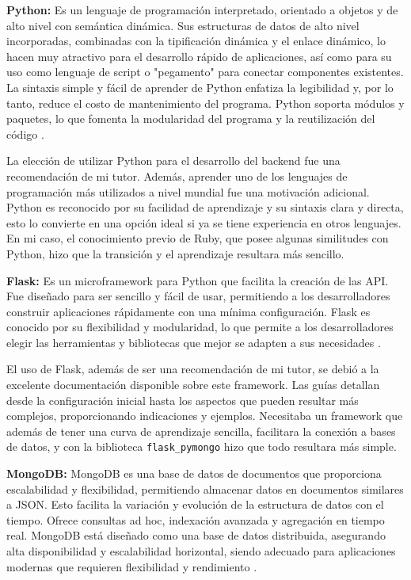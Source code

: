 \textbf{Python:} Es un lenguaje de programación interpretado, orientado a objetos y de alto nivel con semántica dinámica. Sus estructuras de datos de alto nivel incorporadas, combinadas con la tipificación dinámica y el enlace dinámico, lo hacen muy atractivo para el desarrollo rápido de aplicaciones, así como para su uso como lenguaje de script o "pegamento" para conectar componentes existentes. La sintaxis simple y fácil de aprender de Python enfatiza la legibilidad y, por lo tanto, reduce el costo de mantenimiento del programa. Python soporta módulos y paquetes, lo que fomenta la modularidad del programa y la reutilización del código \cite{python_faq}.

La elección de utilizar Python para el desarrollo del backend fue una recomendación de mi tutor. Además, aprender uno de los lenguajes de programación más utilizados a nivel mundial fue una motivación adicional. Python es reconocido por su facilidad de aprendizaje y su sintaxis clara y directa, esto lo convierte en una opción ideal si ya se tiene experiencia en otros lenguajes. En mi caso, el conocimiento previo de Ruby, que posee algunas similitudes con Python, hizo que la transición  y el aprendizaje resultara más sencillo.

\textbf{Flask:} Es un microframework para Python que facilita la creación de las API. Fue diseñado para ser sencillo y fácil de usar, permitiendo a los desarrolladores construir aplicaciones rápidamente con una mínima configuración. Flask es conocido por su flexibilidad y modularidad, lo que permite a los desarrolladores elegir las herramientas y bibliotecas que mejor se adapten a sus necesidades \cite{python_basics}.

El uso de Flask, además de ser una recomendación de mi tutor, se debió a la excelente documentación disponible sobre este framework. Las guías detallan desde la configuración inicial hasta los aspectos que pueden resultar más complejos, proporcionando indicaciones y ejemplos. Necesitaba un framework que además de tener una curva de aprendizaje sencilla, facilitara la conexión a bases de datos, y con la biblioteca \texttt{flask\_pymongo} hizo que todo resultara más simple.


\textbf{MongoDB:} MongoDB es una base de datos de documentos que proporciona escalabilidad y flexibilidad, permitiendo almacenar datos en documentos similares a JSON. Esto facilita la variación y evolución de la estructura de datos con el tiempo. Ofrece consultas ad hoc, indexación avanzada y agregación en tiempo real. MongoDB está diseñado como una base de datos distribuida, asegurando alta disponibilidad y escalabilidad horizontal, siendo adecuado para aplicaciones modernas que requieren flexibilidad y rendimiento \cite{mongodb}.

